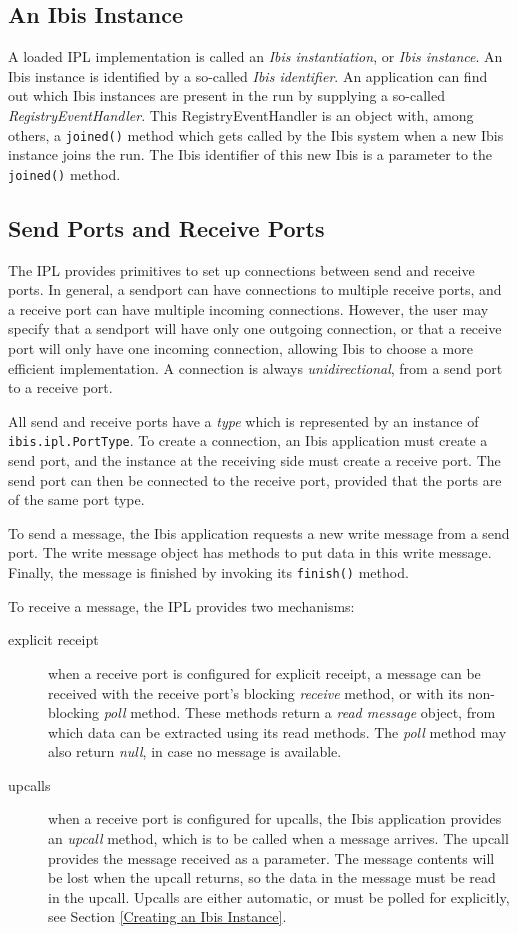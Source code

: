 \documentclass[10pt]{article}
\newcommand{\mysubsection}[1]{\subsection{#1}\label{#1}}
\begin{document}
\mysubsection{An Ibis Instance}

A loaded IPL implementation is called an \emph{Ibis instantiation}, or 
\emph{Ibis instance}.
An Ibis instance is identified by a so-called
\emph{Ibis identifier}.
An application can find out which Ibis instances are present in the run
by supplying a so-called \emph{RegistryEventHandler}.
This RegistryEventHandler is an object with, among others, a \texttt{joined()}
method which gets called by the Ibis system when a new Ibis instance
joins the run.  The Ibis identifier of this new Ibis is a parameter
to the \texttt{joined()} method.

\mysubsection{Send Ports and Receive Ports}

The IPL provides primitives to set up connections between send and receive
ports.
In general, a sendport can have connections to multiple receive ports,
and a receive port can have multiple incoming connections.
However, the user may specify that a sendport will have only one
outgoing connection, or that a receive port will only have one
incoming connection, allowing Ibis to choose a more efficient
implementation.  A connection is always \emph{unidirectional}, from
a send port to a receive port.

All send and receive ports have a \emph{type} which is represented by an
instance of \texttt{ibis.ipl.PortType}.
To create a connection, an Ibis application must create a send port,
and the instance at the receiving side must create a receive port.
The send port can then be connected to the receive port, provided
that the ports are of the same port type.

To send a message, the Ibis application requests a new write message from
a send port. The write message object has methods to put data in this write
message. Finally, the message is finished by invoking its \texttt{finish()}
method.

To receive a message, the IPL provides two mechanisms:
\begin{description}
\item[explicit receipt]
when a receive port is configured for explicit receipt, a message can be
received with the receive port's blocking \emph{receive} method,
or with its non-blocking \emph{poll} method.
These methods return a \emph{read message} object, from which data can
be extracted using its read methods. The \emph{poll} method may also
return \emph{null}, in case no message is available.
\item[upcalls]
when a receive port is configured for upcalls, the Ibis application provides
an \emph{upcall} method, which is to be called when a message arrives.
The upcall provides the message received as a parameter.
The message contents will be lost when the upcall returns, so the data
in the message must be read in the upcall.
Upcalls are either automatic, or must be polled for explicitly, see Section
\ref{Creating an Ibis Instance}.
\end{description}
\noindent
\end{document}
